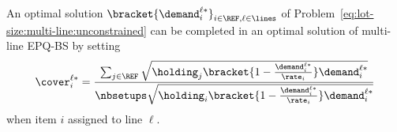 \begin{prop}\label{thm:lot-size:multi-line:unconstrained:optimality}
An optimal solution $\bracket{\demand_i^{\ell*}}_{i\in\REF,\ell\in\lines}$ of Problem~\eqref{eq:lot-size:multi-line:unconstrained} can be completed in an optimal solution of multi-line EPQ-BS by setting
\begin{equation}\label{eq:lot-size:multi-line:unconstrained:optimal-cover}
  \cover_i^{\ell*}= \frac{\sum_{j\in\REF}\sqrt{\holding_j\bracket{1-\frac{\demand_i^{\ell*}}{\rate_i}}\demand_i^{\ell*}}}{\nbsetups\sqrt{\holding_i\bracket{1-\frac{\demand_i^{\ell*}}{\rate_i}}\demand_i^{\ell*}}}
\end{equation}
when item $i$ assigned to line $\ell$.
\end{prop}










